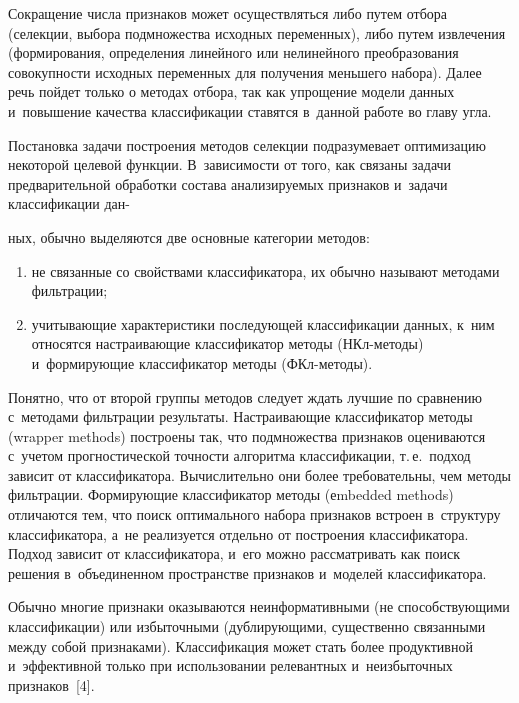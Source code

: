 \begin{multicols}{2}
     Сокращение числа признаков может осуществляться либо путем отбора 
(селекции, выбора подмножества исходных переменных), либо путем 
извлечения (формирования, определения линейного или нелинейного 
преобразования со\-во\-куп\-ности исходных переменных для получения меньшего 
набора). Далее речь пойдет только о методах отбора, так как упрощение модели 
данных и~повышение качества классификации ставятся в~данной работе во 
главу угла. 
     
     Постановка задачи построения методов селекции подразумевает 
оптимизацию некоторой целевой функции. В~зависимости от того, как связаны 
задачи предварительной обработки состава анализируемых признаков и~задачи 
классификации дан-\linebreak\vspace*{-12pt}

\pagebreak

\noindent
ных, обычно выделяются две основные категории методов: 
     \begin{enumerate}[(1)]
\item не связанные со свойствами классификатора, их обычно называют 
методами фильтрации;
\item учитывающие характеристики последующей классификации данных, 
к~ним относятся настраивающие классификатор методы (НКл-ме\-то\-ды) 
и~формирующие классификатор методы (ФКл-ме\-тоды). 
\end{enumerate}

     Понятно, что от второй группы методов следует ждать лучшие по 
сравнению с~методами фильтрации результаты. Настраивающие классификатор методы (wrapper methods) 
построены так, что подмножества признаков оцениваются с~учетом 
прогностической точности алгоритма классификации, т.\,е.\ подход зависит от 
классификатора. Вы\-чис\-ли\-тель\-но они более требовательны, чем методы 
фильтрации. Формирующие классификатор ме\-то\-ды (еmbedded methods) отличаются тем, что поиск 
оптимального набора признаков встроен в~структуру классификатора, а~не 
реализуется отдельно от построения классификатора. Подход зависит от 
классификатора, и~его можно рассматривать как поиск решения 
в~объединенном пространстве признаков и~моделей классификатора. 
     
     Обычно многие признаки оказываются неинформативными (не 
способствующими классификации) или избыточными (дублирующими, 
существенно связанными между собой признаками). Классификация может 
стать более продуктивной и~эффективной только при использовании 
релевантных и~неизбыточных признаков~[4]. 
     

\end{multicols}
